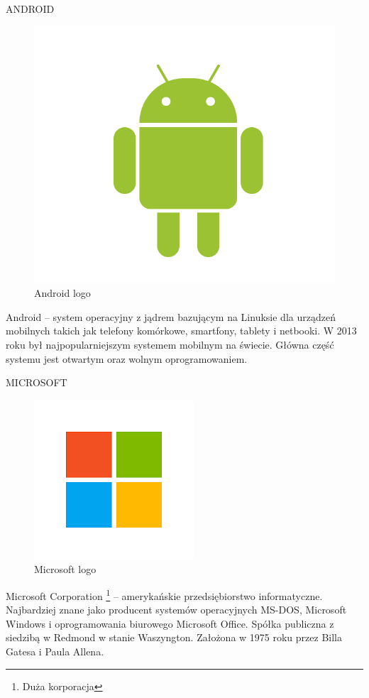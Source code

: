 \documentclass[aspectratio=169,xcolor=dvipsnames, t]{beamer}
\begin{document}

\begin{frame}{ANDROID}
    \begin{figure}
    \centering
        \includegraphics[width=0.5\linewidth]{android.png}
    \caption{Android logo}
    \label{fig:android}
\end{figure}

Android – system operacyjny z jądrem bazującym na Linuksie dla urządzeń mobilnych takich jak telefony komórkowe, smartfony, tablety i netbooki. W 2013 roku był najpopularniejszym systemem mobilnym na świecie. Główna część systemu jest otwartym oraz wolnym oprogramowaniem.

\end{frame}


\begin{frame}{MICROSOFT}
    \begin{figure}
    \centering
    \includegraphics[width=0.5\linewidth]{microsoft.png}
    \caption{Microsoft logo}
    \label{fig:Microsoft}
\end{figure}

Microsoft Corporation \footnote{Duża korporacja} – amerykańskie przedsiębiorstwo informatyczne. Najbardziej znane jako producent systemów operacyjnych MS-DOS, Microsoft Windows i oprogramowania biurowego Microsoft Office. Spółka publiczna z siedzibą w Redmond w stanie Waszyngton. Założona w 1975 roku przez Billa Gatesa i Paula Allena.



\end{frame}
\end{document}
